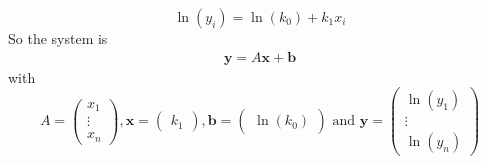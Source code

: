\documentclass{beamer}
\def\bb{\mathbf{b}}
\def\bx{\mathbf{x}}
\def\by{\mathbf{y}}
\begin{document}
\begin{frame}
\[
\ln(y_i) = \ln (k_0)+k_1x_i
\]
So the system is
\begin{align*}
\by = A\bx+\bb
\end{align*}
with
\[
A = \begin{pmatrix}
x_1\\ \vdots \\ x_n
\end{pmatrix},
\bx = \begin{pmatrix}
k_1
\end{pmatrix},
\bb = \begin{pmatrix}
\ln (k_0)
\end{pmatrix}
\textrm{ and }
\by = \begin{pmatrix}
\ln (y_1)\\ \vdots\\ \ln (y_n)
\end{pmatrix}
\]
\end{frame}
\end{document}

